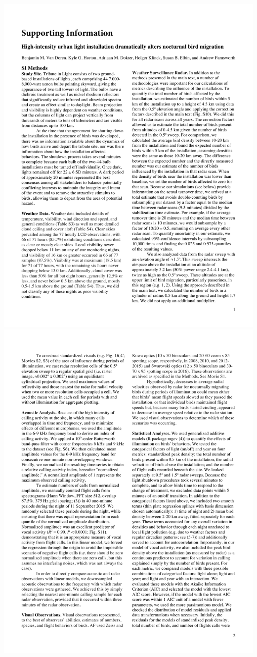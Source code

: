 \documentclass[a4paper, twoside]{templates/ociamthesis}
\begin{document}
\includegraphics[width=1\linewidth]{pdf_chapters/lights/lights_supp_crop_Part05}
\includegraphics[width=1\linewidth]{pdf_chapters/lights/lights_supp_crop_Part06}
\end{document}
